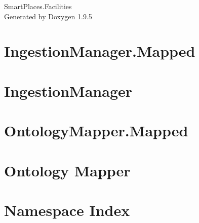 \documentclass[twoside]{book}
\newcommand{\+}{\discretionary{\mbox{\scriptsize$\hookleftarrow$}}{}{}}
\newcommand{\clearemptydoublepage}{%
    \newpage{\pagestyle{empty}\cleardoublepage}%
  }
\begin{document}
  \raggedbottom
    \hypersetup{pageanchor=false,
                bookmarksnumbered=true,
                pdfencoding=unicode
               }
  \begin{titlepage}
  \vspace*{7cm}
  \begin{center}%
  {\Large Smart\+Places.\+Facilities}\\
  \vspace*{1cm}
  {\large Generated by Doxygen 1.9.5}\\
  \end{center}
  \end{titlepage}
  \clearemptydoublepage
  \tableofcontents
  \clearemptydoublepage
  \hypersetup{pageanchor=true}
\chapter{Ingestion\+Manager.\+Mapped}
\label{md_lib__ingestion_manager__mapped__r_e_a_d_m_e}

\chapter{Ingestion\+Manager}
\label{md_lib__ingestion_manager__r_e_a_d_m_e}

\chapter{Ontology\+Mapper.\+Mapped}
\label{md_lib__ontology_mapper__mapped__r_e_a_d_m_e}

\chapter{Ontology Mapper}
\label{md_lib__ontology_mapper__r_e_a_d_m_e}

\chapter{Namespace Index}

\end{document}
